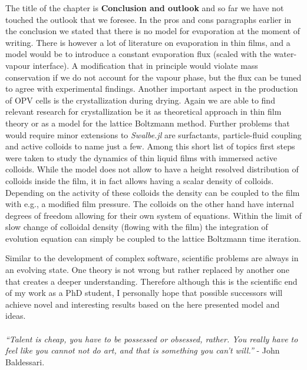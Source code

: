 The title of the chapter is \textbf{Conclusion and outlook} and so far we have not touched the outlook that we foresee.
In the pros and cons paragraphs earlier in the conclusion we stated that there is no model for evaporation at the moment of writing.
There is however a lot of literature on evaporation in thin films, and a model would be to introduce a constant evaporation flux (scaled with the water-vapour interface).
A modification that in principle would violate mass conservation if we do not account for the vapour phase, but the flux can be tuned to agree with experimental findings.
Another important aspect in the production of OPV cells is the crystallization during drying.
Again we are able to find relevant research for crystallization be it as theoretical approach in thin film theory or as a model for the lattice Boltzmann method.
Further problems that would require minor extensions to \textit{Swalbe.jl} are surfactants, particle-fluid coupling and active colloids to name just a few. 
Among this short list of topics first steps were taken to study the dynamics of thin liquid films with immersed active colloids.
While the model does not allow to have a height resolved distribution of colloids inside the film, it in fact allows having a scalar density of colloids.
Depending on the activity of these colloids the density can be coupled to the film with e.g., a modified film pressure.
The colloids on the other hand have internal degrees of freedom allowing for their own system of equations.
Within the limit of slow change of colloidal density (flowing with the film) the integration of evolution equation can simply be coupled to the lattice Boltzmann time iteration. 

Similar to the development of complex software, scientific problems are always in an evolving state.
One theory is not wrong but rather replaced by another one that creates a deeper understanding.
Therefore although this is the scientific end of my work as a PhD student, I personally hope that possible successors will achieve novel and interesting results based on the here presented model and ideas.\\
\\

\textit{``Talent is cheap, you have to be possessed or obsessed, rather. You really have to feel like you cannot not do art, and that is something you can’t will.''} - John Baldessari.

